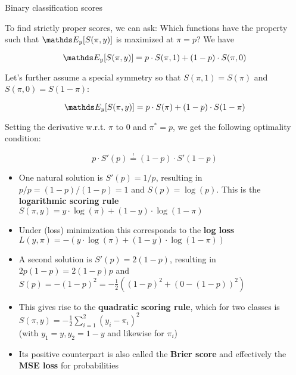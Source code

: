 \documentclass[11pt,compress,t,notes=noshow, xcolor=table]{beamer}
\begin{document}
\begin{vbframe}{Binary classification scores}

To find strictly proper scores, we can ask: Which functions have the property such that $\E_y[S(\pi,y)]$ is maximized at $\pi=p$? We have

$$\E_{y}[S(\pi, y)]=p \cdot S(\pi, 1) + (1-p) \cdot S(\pi, 0)$$

Let's further assume a special symmetry so that $S(\pi,1)=S(\pi)$ and $S(\pi, 0)=S(1-\pi)$:

$$\E_{y}[S(\pi, y)]=p \cdot S(\pi) + (1-p) \cdot S(1-\pi)$$

\vspace{0.2cm}

Setting the derivative w.r.t. $\pi$ to $0$ and $\pi^{\ast}=p$, we get the following optimality condition:

\vspace{0.3cm}

$$p \cdot S'(p) \overset{!}{=} (1-p) \cdot S'(1-p)$$

\framebreak

\begin{itemize}
    \item One natural solution is $S'(p)=1/p$, resulting in $p/p=(1-p)/(1-p)=1$ and $S(p)=\log(p)$. This is the \textbf{logarithmic scoring rule} $S(\pi,y)=y \cdot \log(\pi) + (1-y) \cdot \log(1-\pi)$
    \item Under (loss) minimization this corresponds to the \textbf{log loss} $L(y,\pi)=-(y \cdot \log(\pi) + (1-y) \cdot \log(1-\pi))$
    \item A second solution is $S'(p)=2(1-p)$, resulting in $2p(1-p)=2(1-p)p$ and $S(p)=-(1-p)^2=-\frac{1}{2}((1-p)^2+(0-(1-p))^2)$
    \item This gives rise to the \textbf{quadratic scoring rule}, which for two classes is $S(\pi,y)=-\frac{1}{2} \sum_{i=1}^{2}(y_i-\pi_i)^2$\\ {\small (with $y_1=y, y_2=1-y$ and likewise for $\pi_i$)}
    \item Its positive counterpart is also called the \textbf{Brier score} and effectively the \textbf{MSE loss} for probabilities
\end{itemize}

\end{vbframe}



\endlecture
\end{document}
